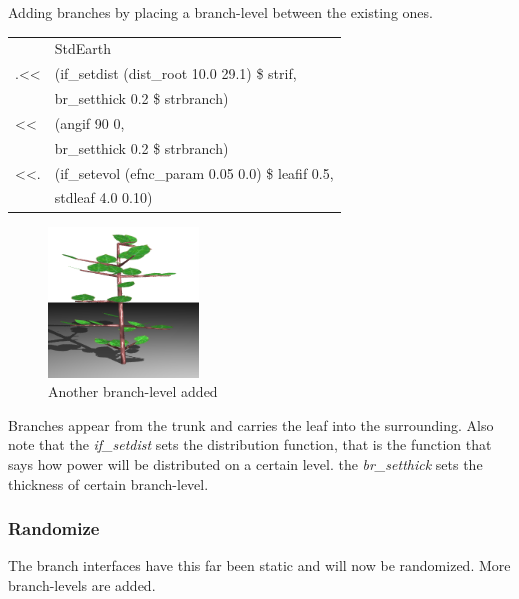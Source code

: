     Adding branches by placing a branch-level between the existing ones.

\begin{tabular}{ll}
  &StdEarth\\
  .<<&(if\_setdist (dist\_root 10.0 29.1) \$ strif,\\
  &br\_setthick 0.2 \$ strbranch)\\
  <<&(angif 90 0,\\
  &br\_setthick 0.2 \$ strbranch)\\
  <<.&(if\_setevol (efnc\_param 0.05 0.0) \$ leafif 0.5,\\
  &stdleaf 4.0 0.10)\\
\end{tabular}

\begin{figure}[htb]
        \centering
        \includegraphics[height=4cm,width=4cm, angle=0]{images/dbex1}
        \caption{Another branch-level added}
        \label{fig:graph3}
\end{figure}

    Branches appear from the trunk and carries the leaf into the surrounding.
    Also note that the \emph{if\_setdist} sets the distribution function, that
    is the function that says how power will be distributed on a certain level.
    the \emph{br\_setthick} sets the thickness of certain branch-level.

\subsubsection{Randomize}

    The branch interfaces have this far been static and will now be randomized.
    More branch-levels are added.

